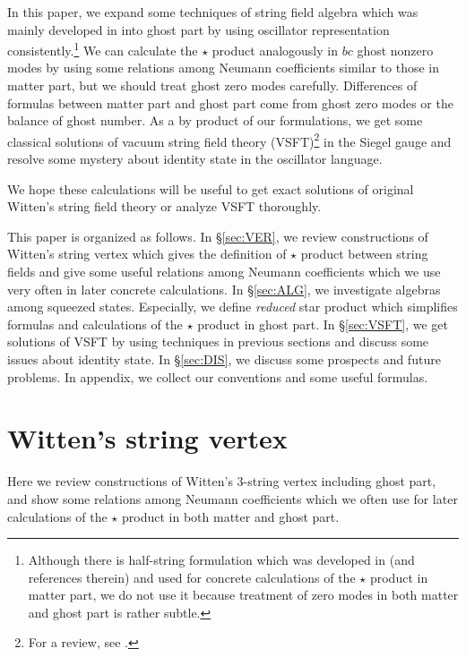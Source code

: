 \documentclass[12pt,a4paper]{article}
\begin{document}
In this paper, we expand some techniques of string field algebra which was mainly developed in \cite{RSZ}\cite{FO} into ghost part by using oscillator representation consistently.\footnote{
Although there is  half-string formulation which was developed in \cite{HALF}\cite{RSZ}\cite{KOM} (and references therein) and used for concrete calculations of the $\star$ product in matter part, we do not use it because treatment of zero modes in both matter and ghost part is rather subtle.}
We can calculate the $\star$ product analogously in $bc$ ghost nonzero modes by using some relations among Neumann coefficients similar to those in matter part, but we should treat ghost zero modes carefully. Differences of formulas between matter part and ghost part come from ghost zero modes or the balance of ghost number. As a by product of our formulations, we get some classical solutions of vacuum string field theory (VSFT)\footnote{
	For a review, see \cite{VSFT}.
} in the Siegel gauge and resolve some mystery about identity state in the oscillator language.

We hope these calculations will be useful to get exact solutions of original Witten's string field theory \cite{Witten} or analyze VSFT thoroughly.

This paper is organized as follows.
In \S \ref{sec:VER}, we review constructions of Witten's string vertex which gives the definition of $\star$ product between string fields and give some useful relations among Neumann coefficients which we use very often in later concrete calculations.
In \S \ref{sec:ALG}, we investigate algebras among squeezed states. Especially, we define {\it reduced} star product which simplifies formulas and calculations of the $\star$ product in ghost part.
In \S \ref{sec:VSFT}, we get solutions of VSFT by using techniques in previous sections and discuss some issues about identity state.
In \S \ref{sec:DIS}, we discuss some prospects and future problems.
In appendix, we collect our conventions and some useful formulas.


\section{Witten's string vertex \label{sec:VER}}

Here we review constructions of Witten's 3-string vertex including ghost part, and show some relations among Neumann coefficients which we often use for later calculations of the $\star$ product in both matter and ghost part.
\end{document}
